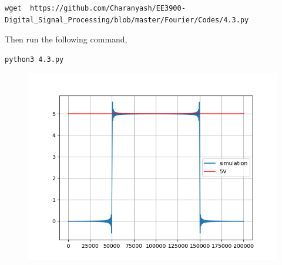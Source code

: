 \documentclass[journal,12pt,twocolumn]{IEEEtran}
\renewcommand\thesection{\arabic{section}}
\begin{document}
\begin{enumerate}[label=\thesection.\arabic*
,ref=\thesection.\theenumi]
  \begin{lstlisting}
wget  https://github.com/Charanyash/EE3900-Digital_Signal_Processing/blob/master/Fourier/Codes/4.3.py
\end{lstlisting}
Then run the following command,
 \begin{lstlisting}
python3 4.3.py
  \end{lstlisting}
  \begin{figure}[!ht]
	\centering
	\includegraphics[width = \columnwidth]{Figs/4.3.png}
	\caption{}
	\label{fig:conv}
    \end{figure}

\end{enumerate}
\end{document}
